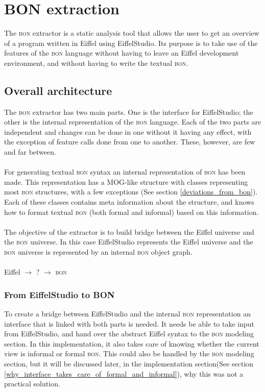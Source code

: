 \section{BON extraction}
The \textsc{bon} extractor is a static analysis tool that allows the user to get an overview of a program written in Eiffel using EiffelStudio. Its purpose is to take use of the features of the \textsc{bon} language without having to leave an Eiffel development environment, and without having to write the textual \textsc{bon}.

\subsection{Overall architecture}
The \textsc{bon} extractor has two main parts. One is the interface for EiffelStudio; the other is the internal representation of the \textsc{bon} language. Each of the two parts are independent and changes can be done in one without it having any effect, with the exception of feature calls done from one to another. These, however, are few and far between. 

\paragraph{}
For generating textual \textsc{bon} syntax an internal representation of \textsc{bon} has been made. This representation has a MOG-like structure with classes representing most \textsc{bon} structures, with a few exceptions (See section \ref{deviations_from_bon}).  Each of these classes contains meta information about the structure, and knows how to format textual \textsc{bon} (both formal and informal) based on this information. 

\paragraph{}
The objective of the extractor is to build bridge between the Eiffel universe and the \textsc{bon} universe.  In this case EiffelStudio represents the Eiffel universe and the \textsc{bon} universe is represented by an internal \textsc{bon} object graph.

\paragraph{}
Eiffel $\rightarrow$ ? $\rightarrow$ \textsc{bon}

\subsubsection{From EiffelStudio to BON}
To create a bridge between EiffelStudio and the internal \textsc{bon} representation an interface that is linked with both parts is needed. It needs be able to take input from EiffelStudio, and hand over the abstract Eiffel syntax to the \textsc{bon} modeling section. In this implementation, it also takes care of knowing whether the current view is informal or formal \textsc{bon}. This could also be handled by the \textsc{bon} modeling section, but it will be discussed later, in the implementation section(See section \ref{why_interface_takes_care_of_formal_and_informal}), why this was not a practical solution.

